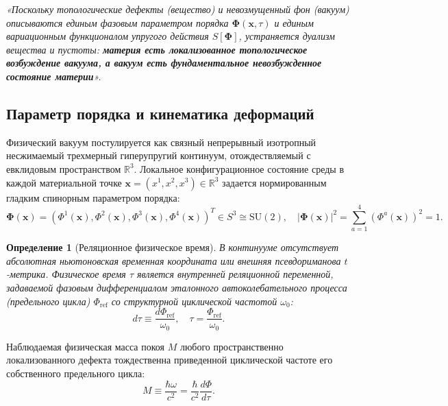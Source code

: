 \documentclass[12pt,a4paper]{article}
\newtheorem{definition}{Определение}
\begin{document}
	\begin{center}
		\textit{«Поскольку топологические дефекты (вещество) и невозмущенный фон (вакуум) описываются единым фазовым параметром порядка $\boldsymbol{\Phi}(\mathbf{x}, \tau)$ и единым вариационным функционалом упругого действия $S[\boldsymbol{\Phi}]$, устраняется дуализм вещества и пустоты: \textbf{материя есть локализованное топологическое возбуждение вакуума, а вакуум есть фундаментальное невозбужденное состояние материи}».}
	\end{center}
	
	\subsection{Параметр порядка и кинематика деформаций}
	Физический вакуум постулируется как связный непрерывный изотропный несжимаемый трехмерный гиперупругий континуум, отождествляемый с евклидовым пространством $\mathbb{R}^3$. Локальное конфигурационное состояние среды в каждой материальной точке $\mathbf{x} = (x^1, x^2, x^3) \in \mathbb{R}^3$ задается нормированным гладким спинорным параметром порядка:
	\begin{equation}
		\boldsymbol{\Phi}(\mathbf{x}) = \left(\Phi^1(\mathbf{x}), \Phi^2(\mathbf{x}), \Phi^3(\mathbf{x}), \Phi^4(\mathbf{x})\right)^T \in S^3 \cong \mathrm{SU}(2), \quad |\boldsymbol{\Phi}(\mathbf{x})|^2 = \sum_{a=1}^4 (\Phi^a(\mathbf{x}))^2 = 1.
	\end{equation}
	
	\begin{definition}[Реляционное физическое время]
		В континууме отсутствует абсолютная ньютоновская временная координата или внешняя псевдориманова $t$-метрика. Физическое время $\tau$ является внутренней реляционной переменной, задаваемой фазовым дифференциалом эталонного автоколебательного процесса (предельного цикла) $\Phi_{\text{ref}}$ со структурной циклической частотой $\omega_0$:
		\begin{equation}
			d\tau \equiv \frac{d\Phi_{\text{ref}}}{\omega_0}, \quad \tau = \frac{\Phi_{\text{ref}}}{\omega_0}.
		\end{equation}
	\end{definition}
	
	Наблюдаемая физическая масса покоя $M$ любого пространственно локализованного дефекта тождественна приведенной циклической частоте его собственного предельного цикла:
	\begin{equation}
		M \equiv \frac{\hbar \omega}{c^2} = \frac{\hbar}{c^2} \frac{d\Phi}{d\tau}.
	\end{equation}
	
\end{document}

